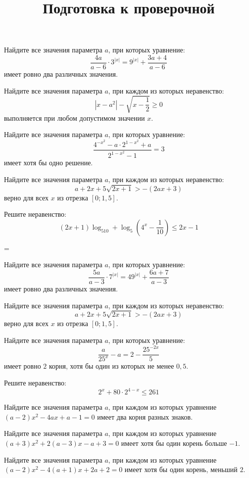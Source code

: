 \begin{class}[number=7]
	\title{Подготовка к проверочной}
	\begin{listofex}
		\item Найдите все значения параметра \( a \), при которых уравнение:
		\[ \dfrac{4a}{a-6}\cdot3^{|x|}=9^{|x|}+\dfrac{3a+4}{a-6} \]
		имеет ровно два различных значения.
		\item Найдите все значения параметра \( a \), при каждом из которых неравенство:
		\[ |x-a^2|-\sqrt{x-\dfrac{1}{2}}\ge0 \]
		выполняется при любом допустимом значении \( x \).
		\item Найдите все значения параметра \( a \), при которых уравнение:
		\[ \dfrac{4^{-x^2}-a\cdot2^{1-x^2}+a}{2^{1-x^2}-1}=3 \]
		имеет хотя бы одно решение.
		\item Найдите все значения параметра \( a \), при каждом из которых неравенство:
		\[ a+2x+5\sqrt{2x+1}>-(2ax+3) \]
		верно для всех \( x \) из отрезка \( [0;1,5] \).
		\item Решите неравенство:
		\[ (2x+1)\log_510+\log_5\left( 4^x-\dfrac{1}{10} \right)\le2x-1 \]
	\end{listofex}
\end{class}

=%
\begin{class}[number=8]
	\begin{listofex}
		\item Найдите все значения параметра \( a \), при которых уравнение:
		\[ \dfrac{5a}{a-3}\cdot7^{|x|}=49^{|x|}+\dfrac{6a+7}{a-3} \]
		имеет ровно два различных значения.
		\item Найдите все значения параметра \( a \), при каждом из которых неравенство:
		\[ a+2x+5\sqrt{2x+1}>-(2ax+3) \]
		верно для всех \( x \) из отрезка \( [0;1,5] \).
		\item Найдите все значения параметра \( a \), при которых уравнение:
		\[ \dfrac{a}{25^x}-a=2-\dfrac{25^{-2x}}{5} \]
		имеет ровно \( 2 \) корня, хотя бы один из которых не менее \( 0,5 \).
		\item Решите неравенство:
		\[ 2^x+80\cdot2^{4-x}\le261 \]
	\end{listofex}
\end{class}

\begin{consultation}
	\begin{listofex}
		\item Найдите все значения параметра \( a \), при каждом из которых уравнение \( (a-2)x^2-4ax+a-1=0 \) имеет два корня разных знаков.
		\item Найдите все значения параметра \( a \), при каждом из которых уравнение \( (a+3)x^2+2(a-3)x-a+3=0 \) имеет хотя бы один корень больше \( -1 \).
		\item Найдите все значения параметра \( a \), при каждом из которых уравнение \( (a-2)x^2-4(a+1)x+2a+2=0 \) имеет хотя бы один корень, меньший \( 2 \).
	\end{listofex}
\end{consultation}
